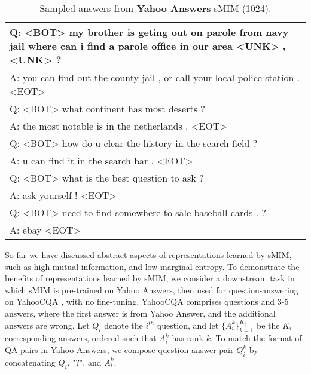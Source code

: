 \documentclass{article}
\begin{document}
\begin{table}[t]
    \centering
    \setlength{\tabcolsep}{0.5em} {\scriptsize
    \renewcommand{\arraystretch}{1.2}\begin{tabular}{p{8cm}}
         \hline
        \rowcolor{Gray}
Q: \textsc{<BOT>} my brother is geting out on parole from navy jail where can i find a parole office in our area \textsc{<UNK>} , \textsc{<UNK>} ? \\
\hline
A: you can find out the county jail , or call your local police station . \textsc{<EOT>} \\
\hline
\hline
        \rowcolor{Gray}
Q: \textsc{<BOT>} what continent has most deserts ? \\
\hline
A: the most notable is in the netherlands . \textsc{<EOT>} \\
\hline
\hline
        \rowcolor{Gray}
Q: \textsc{<BOT>} how do u clear the history in the search field ? \\
\hline
A:  u can find it in the search bar . \textsc{<EOT>} \\
\hline
\hline
        \rowcolor{Gray}
Q: \textsc{<BOT>} what is the best question to ask ? \\
\hline
A: ask yourself ! \textsc{<EOT>} \\
\hline
\hline
        \rowcolor{Gray}
Q: \textsc{<BOT>} need to find somewhere to sale baseball cards . ? \\
\hline
A: ebay \textsc{<EOT>} \\
\hline
\hline
\end{tabular}
    }
        \vspace*{-0.1cm}
    \caption{
    Sampled answers from \textbf{Yahoo Answers} sMIM (1024).
    }
    \label{tab:question-answering-samples}
    \vspace*{-0.1cm}
\end{table}

So far we have discussed abstract aspects of representations learned by sMIM, such as high mutual information, and low marginal entropy.
To demonstrate the benefits of representations learned by sMIM, we consider a downstream task in which sMIM is 
pre-trained on Yahoo Answers, then used for question-answering on YahooCQA 
\citep{DBLP:conf/sigir/TayPLH17}, with no fine-tuning. 
YahooCQA comprises questions and 3-5 answers, where the first answer is from Yahoo Answer, 
and the additional answers are wrong.
Let $Q_i$ denote the $i^{th}$ question, and let $ \{A_i^k\}_{k=1}^{K_i}$ be the $K_i$ 
corresponding answers, ordered such that $A_i^k$ has rank $k$.
To match the format of QA pairs in Yahoo Answers, we compose question-answer 
pair  $Q_i^k$ by concatenating $Q_i$, "?", and $A_i^k$.
\end{document}
